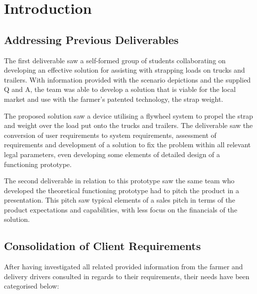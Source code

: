 \documentclass[a4paper,10pt]{article} %
\begin{document}
\justifying

\setcounter{page}{1}



\section{Introduction}

\subsection{Addressing Previous Deliverables}

The first deliverable saw a self-formed group of students collaborating on developing an effective solution for assisting with strapping loads on trucks and trailers. With information provided with the scenario depictions and the supplied Q and A, the team was able to develop a solution that is viable for the local market and use with the farmer's patented technology, the strap weight.  \bigskip

\noindent The proposed solution saw a device utilising a flywheel system to propel the strap and weight over the load put onto the trucks and trailers. The deliverable saw the conversion of user requirements to system requirements, assessment of requirements and development of a solution to fix the problem within all relevant legal parameters, even developing some elements of detailed design of a functioning prototype. \bigskip 

\noindent The second deliverable in relation to this prototype saw the same team who developed the theoretical functioning prototype had to pitch the product in a presentation. This pitch saw typical elements of a sales pitch in terms of the product expectations and capabilities, with less focus on the financials of the solution. \bigskip   

\subsection{Consolidation of Client Requirements}

After having investigated all related provided information from the farmer and delivery drivers consulted in regards to their requirements, their needs have been categorised below:
\end{document}
